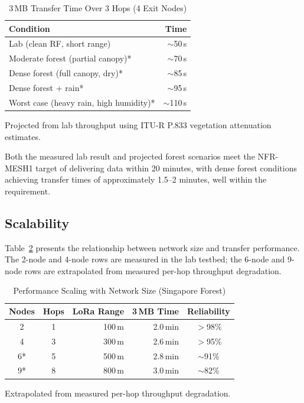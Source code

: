 \documentclass[conference]{IEEEtran}
\begin{document}
\begin{table}[htbp]
  \centering
  \caption{3\,MB Transfer Time Over 3 Hops (4 Exit Nodes)}
  \label{tab:transfer_time}
  \begin{tabular}{@{}lr@{}}
    \toprule
    \textbf{Condition} & \textbf{Time} \\
    \midrule
    Lab (clean RF, short range) & $\sim$50\,s \\
    Moderate forest (partial canopy)* & $\sim$70\,s \\
    Dense forest (full canopy, dry)* & $\sim$85\,s \\
    Dense forest + rain* & $\sim$95\,s \\
    Worst case (heavy rain, high humidity)* & $\sim$110\,s \\
    \bottomrule
  \end{tabular}
  \vspace{1pt}
  \raggedright\footnotesize *Projected from lab throughput using ITU-R P.833 vegetation attenuation estimates.
\end{table}

Both the measured lab result and projected forest scenarios meet the NFR-MESH1 target of delivering data within 20 minutes, with dense forest conditions achieving transfer times of approximately 1.5--2 minutes, well within the requirement.

\subsection{Scalability}

Table~\ref{tab:scalability} presents the relationship between network size and transfer performance. The 2-node and 4-node rows are measured in the lab testbed; the 6-node and 9-node rows are extrapolated from measured per-hop throughput degradation.

\begin{table}[htbp]
  \centering
  \caption{Performance Scaling with Network Size (Singapore Forest)}
  \label{tab:scalability}
  \begin{tabular}{@{}ccrrc@{}}
    \toprule
    \textbf{Nodes} & \textbf{Hops} & \textbf{LoRa Range} & \textbf{3\,MB Time} & \textbf{Reliability} \\
    \midrule
    2 & 1 & 100\,m & 2.0\,min & $>$98\% \\
    4 & 3 & 300\,m & 2.6\,min & $>$95\% \\
    6* & 5 & 500\,m & 2.8\,min & $\sim$91\% \\
    9* & 8 & 800\,m & 3.0\,min & $\sim$82\% \\
    \bottomrule
  \end{tabular}
  \vspace{1pt}
  \raggedright\footnotesize *Extrapolated from measured per-hop throughput degradation.
\end{table}
\end{document}
